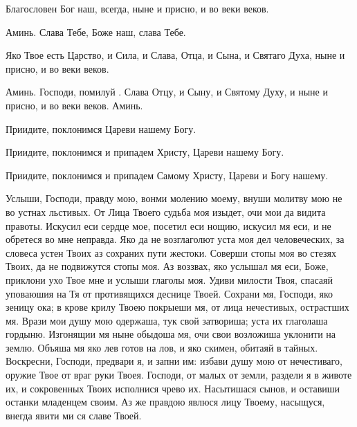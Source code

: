 

\label{_content_chasi-tretiy-shestoy}

\begin{mymulticols}



 Благословен Бог наш, всегда, ныне и присно, и во веки веков.

 Аминь. Слава Тебе, Боже наш, слава Тебе.

\TsariuNebesnyj

\TrisviatoePoOtcheNash

 Яко Твое есть Царство, и Сила, и Слава, Отца, и Сына, и Святаго Духа, ныне и присно, и во веки веков.

 Аминь. Господи, помилуй . Слава Отцу, и Сыну, и Святому Духу, и ныне и присно, и во веки веков. Аминь.

Приидите, поклонимся Цареви нашему Богу.

Приидите, поклонимся и припадем Христу, Цареви нашему Богу.

Приидите, поклонимся и припадем Самому Христу, Цареви и Богу нашему.



Услыши, Господи, правду мою, вонми молению моему, внуши молитву мою не во устнах льстивых. От Лица Твоего судьба моя изыдет, очи мои да видита правоты. Искусил еси сердце мое, посетил еси нощию, искусил мя еси, и не обретеся во мне неправда. Яко да не возглаголют уста моя дел человеческих, за словеса устен Твоих аз сохраних пути жестоки. Соверши стопы моя во стезях Твоих, да не подвижутся стопы моя. Аз воззвах, яко услышал мя еси, Боже, приклони ухо Твое мне и услыши глаголы моя. Удиви милости Твоя, спасаяй уповаюшия на Тя от противящихся деснице Твоей. Сохрани мя, Господи, яко зеницу ока; в крове крилу Твоею покрыеши мя, от лица нечестивых, острастших мя. Врази мои душу мою одержаша, тук свой затвориша; уста их глаголаша гордыню. Изгонящии мя ныне обыдоша мя, очи свои возложиша уклонити на землю. Объяша мя яко лев готов на лов, и яко скимен, обитаяй в тайных. Воскресни, Господи, предвари я, и запни им: избави душу мою от нечестиваго, оружие Твое от враг руки Твоея. Господи, от малых от земли, раздели я в животе их, и сокровенных Твоих исполнися чрево их. Насытишася сынов, и оставиши останки младенцем своим. Аз же правдою явлюся лицу Твоему, насыщуся, внегда явити ми ся славе Твоей.



\end{mymulticols}
